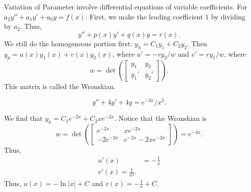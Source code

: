 \begin{definition}
    \alert{Variation of Parameter} involve differential equations
    of variable coefficients. For $a_2y''+a_1y'+a_0y=f(x)$. First,
    we make the leading coefficient $1$ by dividing by $a_2$. Thus,
    $$y'' + p(x)y' + q(x)y = r(x).$$ We still do the homogeneous
    portion first: $y_h = C_1y_1+C_2y_2$. Then $y_p = u(x)y_1(x)+v(x)y_2(x)$,
    where $u' = -ry_2/w$ and $v'=ry_1/w$, where 
    $$w = \det \left( \begin{bmatrix} y_1 & y_2 \\ y_1' & y_2' \end{bmatrix}\right).$$
    This matrix is called the \alert{Wronskian}.
\end{definition}
\begin{example}
    $$y''+4y'+4y = e^{-2x}/x^2.$$
\end{example}
\begin{soln}
    We find that $y_h = C_1e^{-2x} + C_2xe^{-2x}$. Notice that the Wronskian
    is $$w =\det \left( \begin{bmatrix} e^{-2x} & xe^{-2x} \\ -2e^{-2x} & e^{-2x}-2xe^{-2x}
    \end{bmatrix}\right) = e^{-4x}.$$ Thus,
    \begin{align*}
        u'(x) &= -\frac{1}{x} \\
        v'(x) = \frac{1}{x^2}.
    \end{align*}
    Thus, $u(x)=-\ln|x|+C$ and $v(x) = -\frac{1}{x} +C$.
\end{soln}


